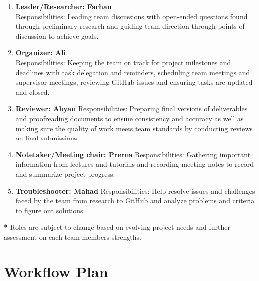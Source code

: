 \documentclass{article}
\begin{document}
\begin{enumerate}
    \item \textbf{Leader/Researcher: Farhan} \\
    Responsibilities: Leading team discussions with open-ended questions found through preliminary research and guiding team direction through points of discussion to achieve goals.
    \item \textbf{Organizer: Ali} \\
    Responsibilities: Keeping the team on track for project milestones and deadlines with task delegation and reminders, scheduling team meetings and supervisor meetings, reviewing GitHub issues and ensuring tasks are updated and closed.  \\
    \item \textbf{Reviewer: Abyan}
    Responsibilities: Preparing final versions of deliverables and proofreading documents to ensure consistency and accuracy as well as making sure the quality of work meets team standards by conducting reviews on final submissions. \\
    \item \textbf{Notetaker/Meeting chair: Prerna} 
    Responsibilities: Gathering important information from lectures and tutorials and recording meeting notes to record and summarize project progress. \\
    \item \textbf{Troubleshooter: Mahad}
    Responsibilities: Help resolve issues and challenges faced by the team from research to GitHub and analyze problems and criteria to figure out solutions.
\end{enumerate}
\noindent\textbf{*} Roles are subject to change based on evolving project needs and further assessment on each team members strengths.




\section{Workflow Plan}
\end{document}
